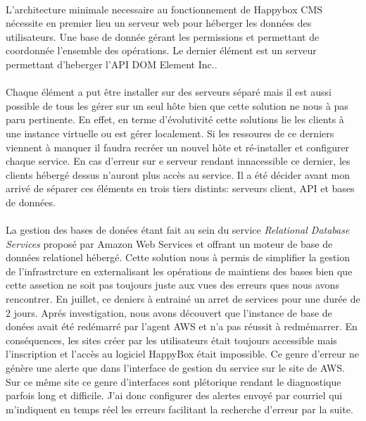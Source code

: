 \documentclass[11pt, a4paper ]{article}
\begin{document}
\begin{spacing}{1.5}
\paragraph{}
L'architecture minimale necessaire au fonctionnement de Happybox CMS nécessite en premier lieu un serveur web pour héberger les données des utilisateurs. Une base de donnée gérant les permissions et permettant de coordonnée l'ensemble des opérations. Le dernier élément est un serveur permettant d'heberger l'API DOM Element Inc.. 
\paragraph{}
Chaque élément a put être installer sur des serveurs séparé mais il est aussi possible de tous les gérer sur un seul hôte bien que cette solution ne nous à pas paru pertinente. En effet, en terme d'évolutivité cette solutions lie les clients à une instance virtuelle ou est gérer localement. 
Si les ressoures de ce derniers viennent à manquer il faudra recréer un nouvel hôte et ré-installer et configurer chaque service. En cas d'erreur sur e serveur rendant innacessible ce dernier, les clients hébergé dessus n'auront plus accès au service.
Il a été décider avant mon arrivé de séparer ces éléments en trois tiers distints: serveurs client, API et bases de données.
\paragraph{}
La gestion des bases de donées étant fait au sein du service \emph{Relational Database Services} proposé par Amazon Web Services et offrant un moteur de base de données relationel hébergé. Cette solution nous à permis de simplifier la gestion de l'infrastrcture en externalisant les opérations de maintiens des bases bien que cette assetion ne soit pas toujours juste aux vues des erreurs ques nous avons rencontrer. En juillet, ce deniers à entrainé un arret de services pour une durée de 2 jours. Aprés investigation, nous avons découvert que l'instance de base de donées avait été redémarré par l'agent AWS et n'a pas réussit à redmémarrer. En conséquences, les sites créer par les utilisateurs était toujours accessible mais l'inscription et l'accès au logiciel HappyBox était impossible.
Ce genre d'erreur ne génère une alerte que dans l'interface de gestion du service sur le site de AWS. Sur ce même site ce genre d'interfaces sont plétorique rendant le diagnostique parfois long et difficile. J'ai donc configurer des alertes envoyé par courriel qui m'indiquent en temps réel les erreurs facilitant la recherche d'erreur par la suite.

\end{spacing}
\end{document}
